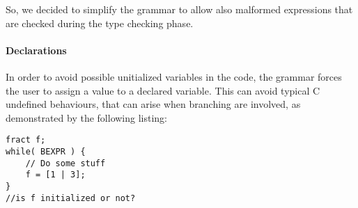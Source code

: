 So, we decided to simplify the grammar to allow also malformed expressions that
are checked during the type checking phase.


\paragraph{Declarations}

In order to avoid possible unitialized variables in the code, the grammar 
forces the user to assign a value to a declared variable. This can avoid
typical C undefined behaviours, that can arise when branching are involved, as
demonstrated by the following listing:
\begin{verbatim}
fract f;
while( BEXPR ) {
    // Do some stuff
    f = [1 | 3];
}
//is f initialized or not?
\end{verbatim}
